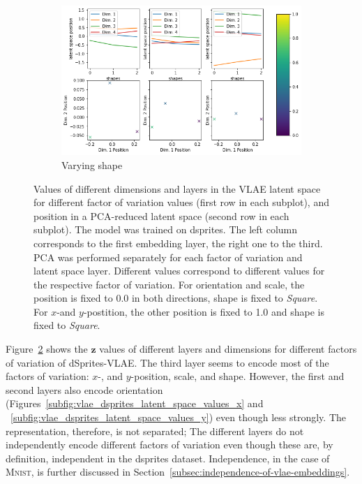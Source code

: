 \begin{figure}
\begin{subfigure}{.48\textwidth}
        \includegraphics[width=\textwidth]{images/latent_space_traversals/vlae_dsprites_shape_latent_space_values.png}
        \caption{Varying shape}
        \label{subfig:vlae_dsprites_latent_space_values_shape}
    \end{subfigure}
    \caption[VLAE on dsprites: Latent Space Values]{Values of different dimensions and layers in the VLAE latent space for different factor of variation values (first row in each subplot), and position in a \ac{PCA}-reduced latent space (second row in each subplot). The model was trained on dsprites. The left column corresponds to the first embedding layer, the right one to the third. \ac{PCA} was performed separately for each factor of variation and latent space layer. Different values correspond to different values for the respective factor of variation. For orientation and scale, the position is fixed to 0.0 in both directions, shape is fixed to \textit{Square}. For $x$-and $y$-postition, the other position is fixed to 1.0 and shape is fixed to \textit{Square}.}
    \label{fig:vlae_dsprites_latent_space_values}
\end{figure}
Figure~\ref{fig:vlae_dsprites_latent_space_values} shows the $\bm{z}$ values of different layers and dimensions for different factors of variation of dSprites-\ac{VLAE}.
The third layer seems to encode most of the factors of variation: $x$-, and $y$-position, scale, and shape.
However, the first and second layers also encode orientation (Figures~\ref{subfig:vlae_dsprites_latent_space_values_x} and ~\ref{subfig:vlae_dsprites_latent_space_values_y}) even though less strongly.
The representation, therefore, is not separated;
The different layers do not independently encode different factors of variation even though these are, by definition, independent in the dsprites dataset.
Independence, in the case of \textsc{Mnist}, is further discussed in Section~\ref{subsec:independence-of-vlae-embeddings}.

